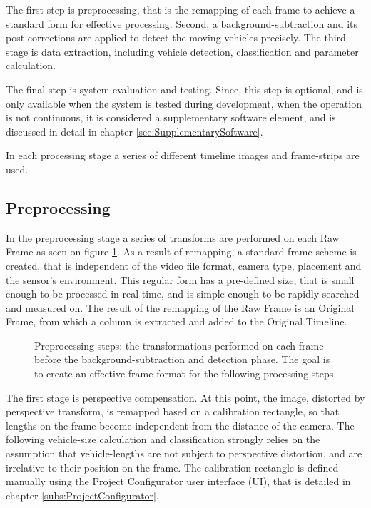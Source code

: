 The first step is preprocessing, that is the remapping of each frame to achieve a standard form for effective processing.
Second, a background-subtraction and its post-corrections are applied to detect the moving vehicles precisely.
The third stage is data extraction, including vehicle detection, classification and parameter calculation.

The final step is system evaluation and testing. 
Since, this step is optional, and is only available when the system is tested during development, when the operation is not continuous, it is considered a supplementary software element, and is discussed in detail in chapter \ref{sec:SupplementarySoftware}.

In each processing stage a series of different timeline images and frame-strips are used.
\subsection{Preprocessing}
In the preprocessing stage a series of transforms are performed on each Raw Frame as seen on figure \ref{fig:transforms}.
As a result of remapping, a standard frame-scheme is created, that is independent of the video file format, camera type, placement and the sensor's environment.
This regular form has a pre-defined size, that is small enough to be processed in real-time, and is simple enough to be rapidly searched and measured on.
The result of the remapping of the Raw Frame is an Original Frame, from which a column is extracted and added to the Original Timeline.

\begin{figure}[!h]
	\centering
	
	\caption{Preprocessing steps: the transformations performed on each frame before the background-subtraction and detection phase. The goal is to create an effective frame format for the following processing steps.\label{fig:transforms}}
\end{figure}

The first stage is perspective compensation.
At this point, the image, distorted by perspective transform, is remapped based on a calibration rectangle, so that lengths on the frame become independent from the distance of the camera.
The following vehicle-size calculation and classification strongly relies on the assumption that vehicle-lengths are not subject to perspective distortion, and are irrelative to their position on the frame.
The calibration rectangle is defined manually using the Project Configurator user interface (UI), that is detailed in chapter \ref{subs:ProjectConfigurator}.

